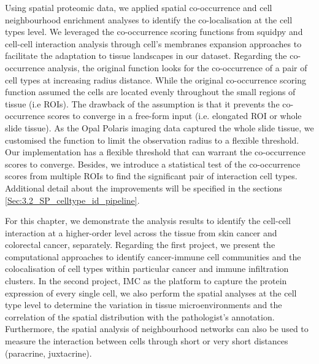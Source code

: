 Using spatial proteomic data, we applied spatial co-occurrence and cell neighbourhood enrichment analyses to identify the co-localisation at the cell types level. We leveraged the co-occurrence scoring functions from squidpy \cite{palla2022squidpy} and cell-cell interaction analysis through cell's membranes expansion approaches \cite{schapiro2017histocat} to facilitate the adaptation to tissue landscapes in our dataset. Regarding the co-occurrence analysis, the original function looks for the co-occurrence of a pair of cell types at increasing radius distance. While the original co-occurrence scoring function assumed the cells are located evenly throughout the small regions of tissue (i.e ROIs). The drawback of the assumption is that it prevents the co-occurrence scores to converge in a free-form input (i.e. elongated ROI or whole slide tissue). As the Opal Polaris imaging data captured the whole slide tissue, we customised the function to limit the observation radius to a flexible threshold. Our implementation has a flexible threshold that can warrant the co-occurrence scores to converge. Besides, we introduce a statistical test of the co-occurrence scores from multiple ROIs to find the significant pair of interaction cell types. Additional detail about the improvements will be specified in the sections \ref{Sec:3.2_SP_celltype_id_pipeline}.

For this chapter, we demonstrate the analysis results to identify the cell-cell interaction at a higher-order level across the tissue from skin cancer and colorectal cancer, separately. Regarding the first project, we present the computational approaches to identify cancer-immune cell communities and the colocalisation of cell types within particular cancer and immune infiltration clusters. In the second project, IMC as the platform to capture the protein expression of every single cell, we also perform the spatial analyses at the cell type level to determine the variation in tissue microenvironments and the correlation of the spatial distribution with the pathologist's annotation. Furthermore, the spatial analysis of neighbourhood networks can also be used to measure the interaction between cells through short or very short distances (paracrine, juxtacrine).

